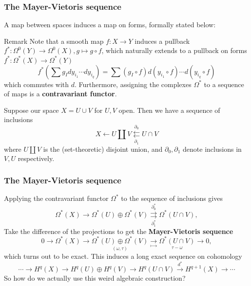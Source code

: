 \documentclass[xcolor=dvipsnames]{beamer}
\begin{document}
\begingroup
\small
\begin{frame}
    \frametitle{The Mayer-Vietoris sequence} 
    A map between spaces induces a map on forms, formally stated below:
    \begin{block}{Remark}
        Note that a smooth map $f \colon X \to Y$ induces a pullback $f^* \colon \Omega^0(Y)\to \Omega^0(X), g \mapsto g \circ f$, which naturally extends to a pullback on forms $f^* \colon \Omega^*(X) \to \Omega^*(Y)$ \[
            f^*\left( \sum g_I dy_{i_1}\cdots dy_{i_q} \right) =\sum \left( g_I \circ f \right) d(y_{i_1}\circ f)\cdots d(y_{i_q}\circ f)
        \] which commutes with $d$. Furthermore, assigning the complexes $\Omega^*$ to a sequence of maps is a \textbf{contravariant functor}.
    \end{block}%
Suppose our space $X=U \cup V$ for $U,V$ open. Then we have a sequence of inclusions \[
X \leftarrow U \amalg V \underset{\partial_1 }{\overset{\partial_0}{\leftleftarrows}}  U \cap V
\] where $U\amalg V$ is the (set-theoretic) disjoint union, and $\partial _0,\partial_1 $ denote inclusions in $V,U$ respectively.
\end{frame}

\begin{frame}
    \frametitle{The Mayer-Vietoris sequence} 
    Applying the contravariant functor $\Omega^*$ to the sequence of inclusions gives \[
    \Omega^*(X) \to \Omega^*(U)\oplus \Omega^*(V) \underset{\partial_1^* }{\overset{\partial_0^* }{\rightrightarrows}}  \Omega^*(U \cap V),
    \] 
        Take the difference of the projections to get the \textbf{Mayer-Vietoris sequence} \[
        0 \longrightarrow\Omega^*(X) \longrightarrow\underset{(\omega,\tau)}{\Omega^*(U) \oplus \Omega^*(V)} \underset{\mapsto }{\longrightarrow}  \underset{\tau - \omega}{\Omega^*(U \cap V)} \longrightarrow 0,
        \] which turns out to be exact. This induces a long exact sequence on cohomology \[
       \cdots \to H^q(X) \to H^q(U) \oplus H^q(V)\to H^q(U \cap V) \overset{d^*}{\to } H^{q+1}(X)\to \cdots 
        \] So how do we actually use this weird algebraic construction?
\end{frame}
\end{document}
